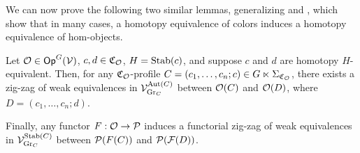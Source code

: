 \documentclass[a4paper,10pt
,draft
]{article}%
\renewcommand{\F}{\mathcal F}
\renewcommand{\1}{\eta}%
\begin{document}
We can now prove the following two similar lemmas, generalizing \cite[Prop. 4.14]{Cav} and \cite[Prop. 2.12]{BM13},
which show that in many cases, a homotopy equivalence of colors induces a homotopy equivalence of hom-objects.

\begin{lemma}
      \label{CAV_4.14_PROP1}
      Let $\O \in \Op^G(\V)$,
      $c,d \in \mathfrak C_\O$, 
      $H = \Stab(c)$, and suppose $c$ and $d$ are homotopy $H$-equivalent.
      Then, for any $\mathfrak C_\O$-profile $C = (c_1,\dots, c_n;c) \in G \ltimes \Sigma_{\mathfrak C_\O}$,
      there exists a zig-zag of weak equivalences in $\V^{\Aut(C)}_{\mathrm{Gr}_C}$
      between $\O(C)$ and $\O(D)$,
      where $D = (c_1,\dots, c_n;d)$.

      Finally, any functor $F: \O \to \P$ induces a functorial zig-zag of weak equivalences in $\V^{\Stab(C)}_{\mathrm{Gr}_C}$
      between $\P(F(C))$ and $\P(\F(D))$.
\end{lemma}
\end{document}
